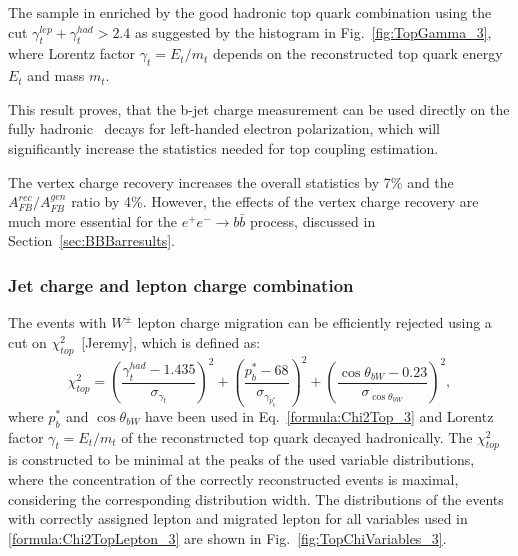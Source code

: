The sample in enriched by the good hadronic top quark combination using the cut $\gamma^{lep}_t + \gamma^{had}_t > 2.4$ as suggested by the histogram in Fig.~\ref{fig:TopGamma_3}, where Lorentz factor $\gamma_t = E_t / m_t$ depends on the reconstructed top quark energy $E_t$ and mass $m_t$.

This result proves, that the  b-jet charge measurement can be used directly on the fully hadronic \ttbar\ decays for left-handed electron polarization, which will significantly increase the statistics needed for top coupling estimation. 

The vertex charge recovery increases the overall statistics by 7\% and the $A_{FB}^{rec}/A^{gen}_{FB}$ ratio by 4\%. 
However, the effects of the vertex charge recovery are much more essential for the $e^+e^-\to b\bar{b}$ process, discussed in Section~\ref{sec:BBBarresults}.

\subsubsection{Jet charge and lepton charge combination}
\label{sec:JetChargeCombo}
The events with $W^\pm$ lepton charge migration can be efficiently rejected using  a cut on $\chi^2_{top}$~[Jeremy], which is defined as:
\begin{equation}
	\label{formula:Chi2TopLepton_3}
	\chi^2_{top} = (\frac{\gamma_t^{had}-1.435}{\sigma_{\gamma_{t}}})^2 + (\frac{p^*_b-68}{\sigma_{\gamma_{p^*_b}}})^2 + (\frac{\cos\theta_{bW} - 0.23}{\sigma_{\cos\theta_{bW}}})^2,
\end{equation}
where $p^*_b$ and $\cos\theta_{bW}$ have been used in Eq.~\ref{formula:Chi2Top_3} and Lorentz factor $\gamma_t=E_{t}/m_{t}$ of the reconstructed top quark decayed hadronically. The $\chi^2_{top}$ is constructed to be minimal at the peaks of the used variable distributions, where the concentration of the correctly reconstructed events is maximal, considering the corresponding distribution width.
The distributions of the events with correctly assigned lepton and migrated lepton for all variables used in \ref{formula:Chi2TopLepton_3} are shown in Fig.~\ref{fig:TopChiVariables_3}.

